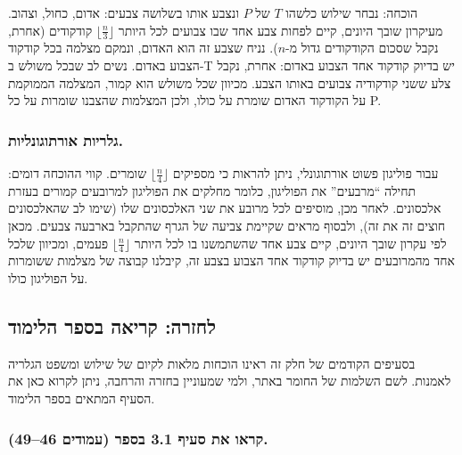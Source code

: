 \documentclass[
]{book}
\begin{document}
הוכחה: נבחר שילוש כלשהו \(T\) של \(P\) ונצבע אותו בשלושה צבעים: אדום, כחול, וצהוב. מעיקרון שובך היונים, קיים לפחות צבע אחד שבו צבועים לכל היותר \(\lfloor \frac{n}{3} \rfloor\) קודקודים (אחרת, נקבל שסכום הקודקודים גדול מ-\(n\)). נניח שצבע זה הוא האדום, ונמקם מצלמה בכל קודקוד הצבוע באדום. נשים לב שבכל משולש ב-T יש בדיוק קודקוד אחד הצבוע באדום: אחרת, נקבל צלע ששני קודקודיה צבועים באותו הצבע. מכיוון שכל משולש הוא קמור, המצלמה הממוקמת על הקודקוד האדום שומרת על כולו, ולכן המצלמות שהצבנו שומרות על כל P.

\hypertarget{ux5d2ux5dcux5e8ux5d9ux5d5ux5ea-ux5d0ux5d5ux5e8ux5eaux5d5ux5d2ux5d5ux5e0ux5dcux5d9ux5d5ux5ea.}{%
\subsubsection*{גלריות אורתוגונליות.}\label{ux5d2ux5dcux5e8ux5d9ux5d5ux5ea-ux5d0ux5d5ux5e8ux5eaux5d5ux5d2ux5d5ux5e0ux5dcux5d9ux5d5ux5ea.}}

עבור פוליגון פשוט אורתוגונלי, ניתן להראות כי מספיקים \(\lfloor \frac{n}{4} \rfloor\) שומרים. קווי ההוכחה דומים: תחילה ``מרבעים'' את הפוליגון, כלומר מחלקים את הפוליגון למרובעים קמורים בעזרת אלכסונים. לאחר מכן, מוסיפים לכל מרובע את שני האלכסונים שלו (שימו לב שהאלכסונים חוצים זה את זה), ולבסוף מראים שקיימת צביעה של הגרף שהתקבל בארבעה צבעים. מכאן לפי עקרון שובך היונים, קיים צבע אחד שהשתמשנו בו לכל היותר \(\lfloor \frac{n}{4} \rfloor\) פעמים, ומכיוון שלכל אחד מהמרובעים יש בדיוק קודקוד אחד הצבוע בצבע זה, קיבלנו קבוצה של מצלמות ששומרות על הפוליגון כולו.

\hypertarget{ux5dcux5d7ux5d6ux5e8ux5d4-ux5e7ux5e8ux5d9ux5d0ux5d4-ux5d1ux5e1ux5e4ux5e8-ux5d4ux5dcux5d9ux5deux5d5ux5d3}{%
\subsection{לחזרה: קריאה בספר הלימוד}\label{ux5dcux5d7ux5d6ux5e8ux5d4-ux5e7ux5e8ux5d9ux5d0ux5d4-ux5d1ux5e1ux5e4ux5e8-ux5d4ux5dcux5d9ux5deux5d5ux5d3}}

בסעיפים הקודמים של חלק זה ראינו הוכחות מלאות לקיום של שילוש ומשפט הגלריה לאמנות. לשם השלמות של החומר באתר, ולמי שמעוניין בחזרה והרחבה, ניתן לקרוא כאן את הסעיף המתאים בספר הלימוד.

\hypertarget{ux5e7ux5e8ux5d0ux5d5-ux5d0ux5ea-ux5e1ux5e2ux5d9ux5e3-3.1-ux5d1ux5e1ux5e4ux5e8-ux5e2ux5deux5d5ux5d3ux5d9ux5dd-4649.}{%
\subsubsection*{קראו את סעיף 3.1 בספר (עמודים 46--49).}\label{ux5e7ux5e8ux5d0ux5d5-ux5d0ux5ea-ux5e1ux5e2ux5d9ux5e3-3.1-ux5d1ux5e1ux5e4ux5e8-ux5e2ux5deux5d5ux5d3ux5d9ux5dd-4649.}}
\end{document}
